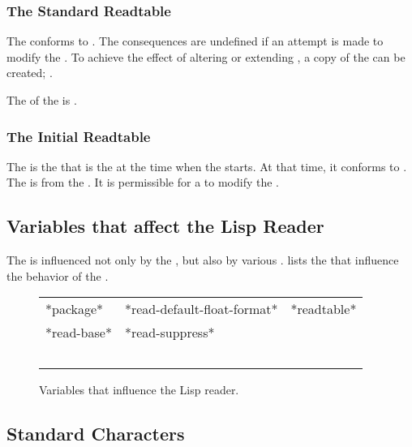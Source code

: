 \subsubsection{The Standard Readtable}

The  conforms to .
The consequences are undefined if an attempt is made
to modify the .
To achieve the effect of altering or extending ,
a copy of the  can be created; .

The  of the  is .

\subsubsection{The Initial Readtable}

The  is
the  that is the 
at the time when the  starts.
At that time, it conforms to .
The  is  
from the .
It is permissible for a  
to modify the .

\subsection{Variables that affect the Lisp Reader}

The  is influenced not only by the ,
but also by various .  
 lists
the  that influence the behavior of the .

\begin{figure}
\label{fig-variables-that-influence-the-lisp-reader}
\begin{tabular}{lll}
*package*&*read-default-float-format*&*readtable*\\
*read-base*&*read-suppress*&\\\
\end{tabular}
\caption{Variables that influence the Lisp reader.}
\end{figure}

\subsection{Standard Characters}

